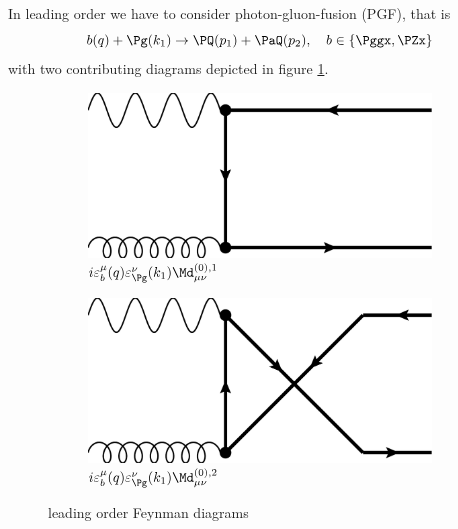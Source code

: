 In leading order we have to consider photon-gluon-fusion (PGF), that is
\begin{equation}
b(q) + \Pg(k_1) \rightarrow \PQ(p_1)+\PaQ(p_2),\quad b\in\{\Pggx,\PZx\}
\end{equation}
with two contributing diagrams depicted in figure \ref{fig:FeynLO}.
\begin{figure}[ht!]
\centering
\begin{subfigure}[t]{.4\textwidth}
	\includegraphics[width=\textwidth]{pyfeyn/lo-1}
	\caption{$i\varepsilon^{\mu}_{b}(q)\varepsilon^{\nu}_{\Pg}(k_1)\Md^{(0),1}_{\mu\nu}$}
\end{subfigure}\hspace{.15\textwidth}%
\begin{subfigure}[t]{.4\textwidth}
	\includegraphics[width=\textwidth]{pyfeyn/lo-2}
	\caption{$i\varepsilon^{\mu}_{b}(q)\varepsilon^{\nu}_{\Pg}(k_1)\Md^{(0),2}_{\mu\nu}$}
\end{subfigure}
\caption{leading order Feynman diagrams}\label{fig:FeynLO}
\end{figure}

